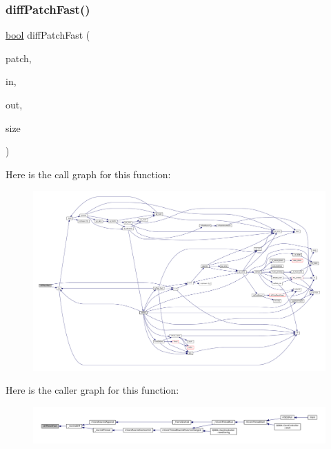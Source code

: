 \subsubsection{\texorpdfstring{diff\+Patch\+Fast()}{diffPatchFast()}}
{\footnotesize\ttfamily \mbox{\hyperlink{libretro_8h_a4a26dcae73fb7e1528214a068aca317e}{bool}} diff\+Patch\+Fast (\begin{DoxyParamCaption}\item[{struct Patch\+Fast $\ast$}]{patch,  }\item[{const void $\ast$restrict}]{in,  }\item[{const void $\ast$restrict}]{out,  }\item[{size\+\_\+t}]{size }\end{DoxyParamCaption})}

Here is the call graph for this function\+:
\nopagebreak
\begin{figure}[H]
\begin{center}
\leavevmode
\includegraphics[width=350pt]{patch-fast_8c_a8cb66d058df5b15ef53ab862be14f59d_cgraph}
\end{center}
\end{figure}
Here is the caller graph for this function\+:
\nopagebreak
\begin{figure}[H]
\begin{center}
\leavevmode
\includegraphics[width=350pt]{patch-fast_8c_a8cb66d058df5b15ef53ab862be14f59d_icgraph}
\end{center}
\end{figure}
\mbox{\label{patch-fast_8c_af3dd4e6e3ab43135351cc1cd3e9bff90}} 
